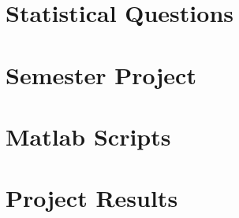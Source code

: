 \documentclass[11pt,a4paper]{report}
\begin{document}
\tableofcontents

\chapter{Statistical Questions}
%


\chapter{Semester Project}










\begin{appendices}
\chapter{Matlab Scripts}

\chapter{Project Results}

\end{appendices}
\end{document}
